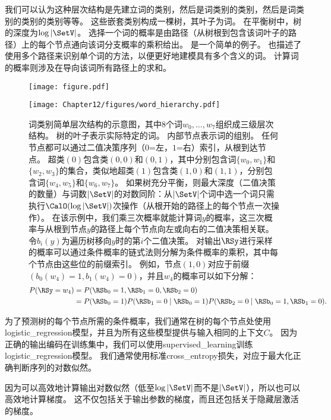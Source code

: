 我们可以认为这种层次结构是先建立词的类别，然后是词类别的类别，然后是词类别的类别的类别等等。
这些嵌套类别构成一棵树，其叶子为词。
在平衡树中，树的深度为$\log |\SetV|$。
选择一个词的概率是由路径（从树根到包含该词叶子的路径）上的每个节点通向该词分支概率的乘积给出。
是一个简单的例子。
\citet{Mnih+Hinton-2009}也描述了使用多个路径来识别单个词的方法，以便更好地建模具有多个含义的词。
计算词的概率则涉及在导向该词所有路径上的求和。
\begin{figure}[htp]
\centering
\ifOpenSource
\centerline{\texttt{[image: figure.pdf]}}
\else
\texttt{[image: Chapter12/figures/word\_hierarchy.pdf]}
\fi
\captionsetup{singlelinecheck=off}
\caption[.]{词类别简单层次结构的示意图，其中8个词$w_0,\dots,w_7$组织成三级层次结构。
树的叶子表示实际特定的词。
内部节点表示词的组别。
任何节点都可以通过二值决策序列（$0$=左，$1$=右）索引，从根到达节点。
超类$(0)$包含类$(0,0)$和$(0,1)$，其中分别包含词$\{w_0,w_1\}$和$\{w_2,w_3\}$的集合，类似地超类$(1)$包含类$(1,0)$和$(1,1)$，分别包含词$\{w_4,w_5\}$和$\{w_6,w_7\}$。
如果树充分平衡，则最大深度（二值决策的数量）与词数$| \SetV |$的对数同阶：从$| \SetV |$个词中选一个词只需执行$\CalO(\log |\SetV|)$次操作（从根开始的路径上的每个节点一次操作）。
在该示例中，我们乘三次概率就能计算词$y$的概率，这三次概率与从根到节点$y$的路径上每个节点向左或向右的二值决策相关联。
令$b_i(y)$为遍历树移向$y$时的第$i$个二值决策。
对输出$\RSy$进行采样的概率可以通过条件概率的链式法则分解为条件概率的乘积，其中每个节点由这些位的前缀索引。
例如，节点$(1,0)$对应于前缀$(b_0(w_4)=1, b_1(w_4)=0)$，并且$w_4$的概率可以如下分解：
\begin{align}
  P(\RSy = w_4) &= P(\RSb_0 = 1, \RSb_1 = 0, \RSb_2 = 0) \\
    &= P(\RSb_0 = 1) P(\RSb_1 = 0 \mid \RSb_0 = 1) P(\RSb_2 = 0 \mid \RSb_0 = 1, \RSb_1 = 0). 
\end{align}
}
\label{fig:chap12_word_hierarchy}
\end{figure}

为了预测树的每个节点所需的条件概率，我们通常在树的每个节点处使用\gls{logistic_regression}模型，并且为所有这些模型提供与输入相同的上下文$C$。
因为正确的输出编码在训练集中，我们可以使用\gls{supervised_learning}训练\gls{logistic_regression}模型。
我们通常使用标准\gls{cross_entropy}损失，对应于最大化正确判断序列的对数似然。

因为可以高效地计算输出对数似然（低至$\log |\SetV|$而不是$ |\SetV|$），所以也可以高效地计算梯度。
这不仅包括关于输出参数的梯度，而且还包括关于隐藏层激活的梯度。

